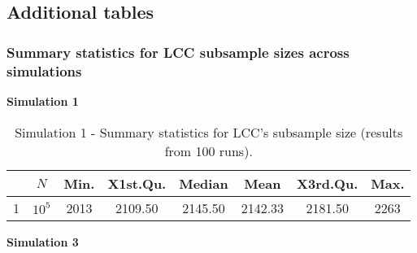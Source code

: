 \subsection{Additional tables}
\label{app:additional-tables}

\subsubsection{Summary statistics for LCC subsample sizes across simulations}
\label{app:summary-stats-Ns}

\textbf{Simulation 1}
\begin{table}[H]
\centering
\begin{tabular}{cccccccc}
  \hline
 & $N$ & Min. & X1st.Qu. & Median & Mean & X3rd.Qu. & Max. \\ 
  \hline
1 & $10^5$ & 2013 & 2109.50 & 2145.50 & 2142.33 & 2181.50 & 2263 \\ 
   \hline
\end{tabular}
\caption[Simulation 1 - Summary statistics for LCC's subsample size.]{Simulation 1 - Summary statistics for LCC's subsample size (results from 100 runs).}
\label{tab:sim1-Ns}
\end{table}

\textbf{Simulation 3}

